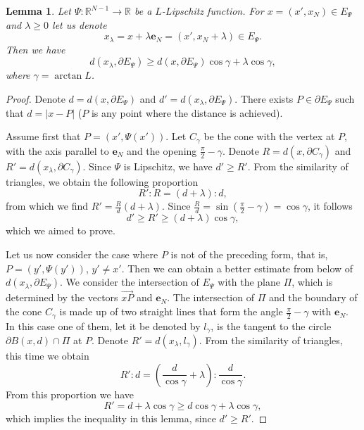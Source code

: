 \documentclass[10pt]{amsart}
\newtheorem{lemma}[theorem]{Lemma}
\theoremstyle{definition}
\numberwithin{equation}{section}
\begin{document}
\begin{lemma}\label{LE.DISTANCE.FROM.GRAPH}
Let $\Psi: \mathbb{R}^{N-1}\to\mathbb{R}$ be a $L$-Lipschitz function.   For $x = (x',x_N)\in E_\Psi$ and $\lambda\ge 0$
let us denote
\begin{equation*}
x_\lambda  =  x  + \lambda \mathbf {e}_N= (x', x_N + \lambda)\in E_\Psi.
\end{equation*}
Then we have
\begin{equation*}
d(x_\lambda, \partial E_\Psi) \ge d(x, \partial E_\Psi) \cos \gamma +  {\lambda\cos \gamma},
\end{equation*}
where  $\gamma  = \arctan L$.
\end{lemma}

\begin{proof}
Denote  $d  =  d(x, \partial E_\Psi)$   and   $d'= d(x_\lambda, \partial E_\Psi)$.   There exists $P\in \partial E_\Psi$
such that $ d = |x - P|$  ($P$ is any point where the distance is achieved).

Assume first that $P = (x', \Psi (x'))$. Let $C_\gamma$ be the cone with the vertex at  $P$,   with the axis parallel to
$\mathbf{e}_N$ and the opening $\frac {\pi}2-\gamma$.                          Denote $R = d(x, \partial C_\gamma) $ and
$R'= d(x_\lambda,  \partial C_\gamma)$.     Since $\Psi$ is Lipschitz,    we have $d'\ge  R'$.   From the similarity  of
triangles,  we obtain the following proportion
\begin{equation*}
R': R = (d+\lambda):d,
\end{equation*}
from which  we  find    $R'  = \frac R d (d+\lambda)$. Since $\frac Rd = \sin (\frac \pi 2 - \gamma) = \cos \gamma$,  it
follows
\begin{equation*}
d'\ge R'\ge (d +\lambda)\cos \gamma,
\end{equation*}
which we aimed to prove.

Let us now  consider the case where $P$ is not of the preceding form, that is, $P =(y', \Psi (y'))$, $y'\ne x'$. Then we
can    obtain a better estimate from below of $d(x_\lambda, \partial E_\Psi)$.  We consider the intersection of $E_\Psi$
with the plane  $\Pi$, which is determined by the vectors $\Vec{xP}$ and $\mathbf{e}_N$.  The intersection of  $\Pi$ and
the boundary of the cone $C_\gamma $ is made up of two straight lines that form the angle      $\frac \pi2-\gamma$  with
$\mathbf{e}_N$.  In  this case one of them, let it be denoted by $l_\gamma$,                is the tangent to the circle
$\partial B(x,d)\cap  \Pi$  at  $P$. Denote   $R' = d(x_\lambda, l_\gamma)$.  From the  similarity of  triangles,   this
time   we  obtain
\begin{equation*}
R': d  = \left(\frac d{\cos \gamma} +\lambda\right) : \frac d{\cos \gamma}.
\end{equation*}
From this proportion we have
\begin{equation*}
R' =  d + \lambda \cos \gamma\ge d \cos \gamma  + \lambda \cos\gamma,
\end{equation*}
which implies   the inequality in this  lemma, since   $d'\ge R'$.
\end{proof}
\end{document}
